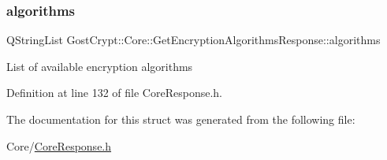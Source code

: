 \subsubsection{\texorpdfstring{algorithms}{algorithms}}
{\footnotesize\ttfamily Q\+String\+List Gost\+Crypt\+::\+Core\+::\+Get\+Encryption\+Algorithms\+Response\+::algorithms}

List of available encryption algorithms 

Definition at line 132 of file Core\+Response.\+h.



The documentation for this struct was generated from the following file\+:\begin{DoxyCompactItemize}
\item 
Core/\hyperlink{_core_response_8h}{Core\+Response.\+h}\end{DoxyCompactItemize}
